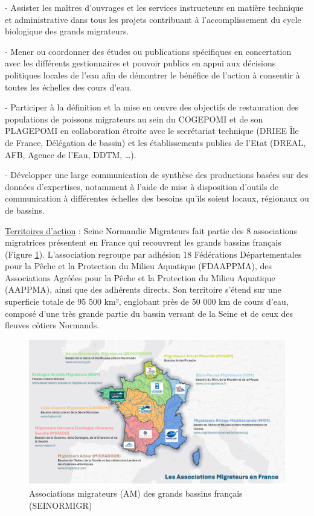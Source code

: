 \documentclass[11pt,titlepage,twoside]{article}\usepackage[]{graphicx}\usepackage[table]{xcolor}
\begin{document}
-	Assister les maîtres d’ouvrages et les services instructeurs en matière technique et administrative dans tous les projets contribuant à l’accomplissement du cycle biologique des grands migrateurs.

-	Mener ou coordonner des études ou publications spécifiques en concertation avec les différents gestionnaires et pouvoir publics en appui aux décisions politiques locales de l’eau afin de démontrer le bénéfice de l’action à consentir à toutes les échelles des cours d’eau.

-	Participer à la définition et la mise en œuvre des objectifs de restauration des populations de poissons migrateurs au sein du COGEPOMI et de son PLAGEPOMI en collaboration étroite avec le secrétariat technique (DRIEE Île de France, Délégation de bassin) et les établissements publics de l’Etat (DREAL, AFB, Agence de l’Eau, DDTM, …).

-	Développer une large communication de synthèse des productions basées sur des données d’expertises, notamment à l’aide de mise à disposition d’outils de communication à différentes échelles des besoins qu’ils soient locaux, régionaux ou de bassins.
\vspace{1cm}

\underline{Territoires d’action} :  Seine Normandie Migrateurs fait partie des 8 associations migratrices présentent en France qui recouvrent les grands bassins français (Figure \ref{AM_National}). 
L’association regroupe par adhésion 18 Fédérations Départementales pour la Pêche et la Protection du Milieu Aquatique (FDAAPPMA), des Associations Agréées pour la Pêche et la Protection du Milieu Aquatique (AAPPMA), ainsi que des adhérents directs. 
Son territoire s’étend sur une superficie totale de 95 500 km², englobant près de 50 000 km de cours d’eau, composé d’une très grande partie du bassin versant de la Seine et de ceux des fleuves côtiers Normands. 

\vspace{1cm}

\begin{figure}[htpb]
\centering
\includegraphics[width=\textwidth]{AM_National.png}
\caption{Associations migrateurs (AM) des grands bassins français (SEINORMIGR)}
\label{AM_National}
\end{figure}
\end{document}
